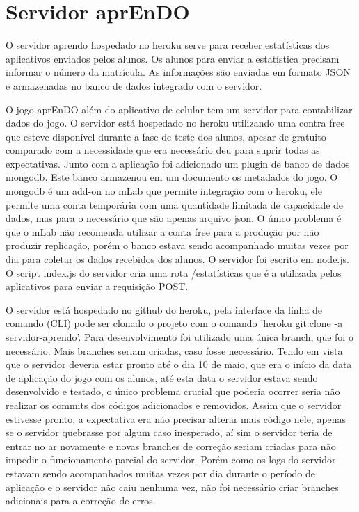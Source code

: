 \section[Servidor aprEnDO]{Servidor aprEnDO}
O servidor aprendo hospedado no heroku serve para receber estatísticas dos aplicativos enviados pelos alunos. Os alunos para enviar a estatística precisam informar o número da matrícula. As informações são enviadas em formato JSON e armazenadas no banco de dados integrado com o servidor.

O jogo aprEnDO além do aplicativo de celular tem um servidor para contabilizar dados do jogo.
O servidor está hospedado no heroku utilizando uma contra free que esteve disponível durante a fase de teste dos alunos, apesar de gratuito comparado com a necessidade que era necessário deu para suprir todas as expectativas. Junto com a aplicação foi adicionado um plugin de banco de dados mongodb. Este banco armazenou em um documento os metadados do jogo. O mongodb é um add-on no mLab que permite integração com o heroku, ele permite uma conta temporária com uma quantidade limitada de capacidade de dados, mas para o necessário que são apenas arquivo json. O único problema é que  o mLab não recomenda utilizar a conta free para a produção por não produzir replicação, porém o banco estava sendo acompanhado muitas vezes por dia para coletar os dados recebidos dos alunos. 
O servidor foi escrito em node.js. O script index.js do servidor cria uma rota /estatísticas que é a utilizada pelos aplicativos para enviar a requisição POST. 

O servidor está hospedado no github do heroku, pela interface da linha de comando (CLI) pode ser clonado o projeto com o comando 'heroku git:clone -a servidor-aprendo'.
Para desenvolvimento foi utilizado uma única branch, que foi o necessário. Mais branches seriam criadas, caso fosse necessário. Tendo em vista que o servidor deveria estar pronto até o dia 10 de maio, que era o início da data de aplicação do jogo com os alunos, até esta data o servidor estava sendo desenvolvido e testado, o único problema crucial que poderia ocorrer seria não realizar os commits dos códigos adicionados e removidos. Assim que o servidor estivesse pronto, a expectativa era não precisar alterar mais código nele, apenas se o servidor quebrasse por algum caso inesperado, aí sim o servidor teria de entrar no ar novamente e novas branches de correção seriam criadas para não impedir o funcionamento parcial do servidor. Porém como os logs do servidor estavam sendo acompanhados muitas vezes por dia durante o período de aplicação e o servidor não caiu nenhuma vez, não foi necessário criar branches adicionais para a correção de erros. 

